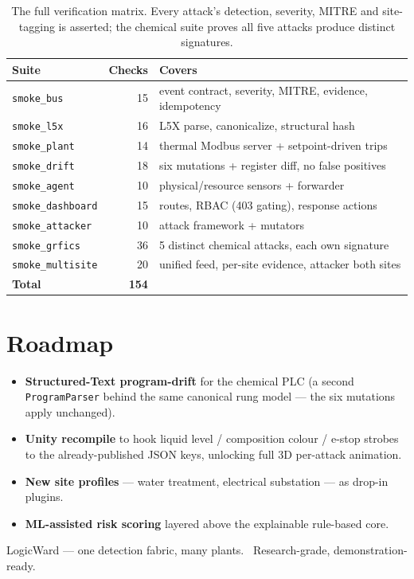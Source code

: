 \documentclass[11pt,a4paper]{article}
\newcommand{\code}[1]{\texttt{\small #1}}
\begin{document}
\begin{table}[h]\small\centering
\renewcommand{\arraystretch}{1.15}
\begin{tabular}{@{}l r l@{}}
\toprule
\textbf{Suite} & \textbf{Checks} & \textbf{Covers}\\
\midrule
\code{smoke\_bus}       & 15 & event contract, severity, MITRE, evidence, idempotency\\
\code{smoke\_l5x}       & 16 & L5X parse, canonicalize, structural hash\\
\code{smoke\_plant}     & 14 & thermal Modbus server + setpoint-driven trips\\
\code{smoke\_drift}     & 18 & six mutations + register diff, no false positives\\
\code{smoke\_agent}     & 10 & physical/resource sensors + forwarder\\
\code{smoke\_dashboard} & 15 & routes, RBAC (403 gating), response actions\\
\code{smoke\_attacker}  & 10 & attack framework + mutators\\
\code{smoke\_grfics}    & 36 & 5 distinct chemical attacks, each own signature\\
\code{smoke\_multisite} & 20 & unified feed, per-site evidence, attacker both sites\\
\midrule
\textbf{Total} & \textbf{154} & \\
\bottomrule
\end{tabular}
\caption{The full verification matrix. Every attack's detection, severity, MITRE and site-tagging
is asserted; the chemical suite proves all five attacks produce distinct signatures.}
\end{table}

\section{Roadmap}
\begin{itemize}[leftmargin=1.3em,itemsep=2pt]
  \item \textbf{Structured-Text program-drift} for the chemical PLC (a second \code{ProgramParser}
        behind the same canonical rung model --- the six mutations apply unchanged).
  \item \textbf{Unity recompile} to hook liquid level / composition colour / e-stop strobes to the
        already-published JSON keys, unlocking full 3D per-attack animation.
  \item \textbf{New site profiles} --- water treatment, electrical substation --- as drop-in plugins.
  \item \textbf{ML-assisted risk scoring} layered above the explainable rule-based core.
\end{itemize}

\vfill
\begin{center}\small\color{muted}
LogicWard --- one detection fabric, many plants. \textbullet\ Research-grade, demonstration-ready.
\end{center}
\end{document}
